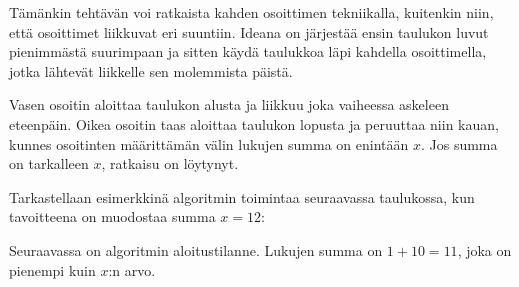 Tämänkin tehtävän voi ratkaista kahden osoittimen
tekniikalla, kuitenkin niin,
että osoittimet liikkuvat eri suuntiin.
Ideana on järjestää ensin taulukon luvut
pienimmästä suurimpaan ja
sitten käydä taulukkoa läpi kahdella osoittimella,
jotka lähtevät liikkelle sen molemmista päistä.

Vasen osoitin aloittaa taulukon alusta ja
liikkuu joka vaiheessa askeleen eteenpäin.
Oikea osoitin taas aloittaa taulukon lopusta
ja peruuttaa niin kauan, kunnes osoitinten
määrittämän välin lukujen summa on enintään $x$.
Jos summa on tarkalleen $x$, ratkaisu on löytynyt.

Tarkastellaan esimerkkinä algoritmin toimintaa
seuraavassa taulukossa, kun tavoitteena on muodostaa
summa $x=12$:
\begin{center}
\end{center}

Seuraavassa on algoritmin aloitustilanne.
Lukujen summa on $1+10=11$, joka on pienempi
kuin $x$:n arvo.

\begin{center}
\end{center}

